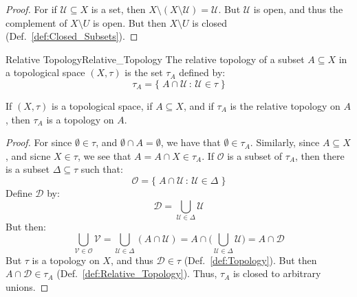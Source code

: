         \begin{proof}
            For if $\mathcal{U}\subseteq{X}$ is a set, then
            $X\setminus(X\setminus\mathcal{U})=\mathcal{U}$. But
            $\mathcal{U}$ is open, and thus the complement of
            $X\setminus{U}$ is open. But then $X\setminus{U}$
            is closed (Def.~\ref{def:Closed_Subsets}).
        \end{proof}
        \begin{ldefinition}{Relative Topology}{Relative_Topology}
            The relative topology of a subset
            $A\subseteq{X}$ in a topological space $(X,\tau)$ is
            the set $\tau_{A}$ defined by:
            \begin{equation}
                \tau_{A}=
                \big\{\;A\cap\mathcal{U}\,:\,
                    \mathcal{U}\in\tau\;\big\}
            \end{equation}
        \end{ldefinition}
        \begin{theorem}
            If $(X,\tau)$ is a topological space, if $A\subseteq{X}$,
            and if $\tau_{A}$ is the relative topology on $A$,
            then $\tau_{A}$ is a topology on $A$.
        \end{theorem}
        \begin{proof}
            For since $\emptyset\in\tau$, and
            $\emptyset\cap{A}=\emptyset$, we have that
            $\emptyset\in\tau_{A}$. Similarly, since
            $A\subseteq{X}$, and sicne $X\in\tau$, we see that
            $A=A\cap{X}\in\tau_{A}$. If $\mathcal{O}$ is a subset
            of $\tau_{A}$, then there is a subset
            $\Delta\subseteq\tau$ such that:
            \begin{equation}
                \mathcal{O}=\big\{\;A\cap\mathcal{U}\,:\,
                    \mathcal{U}\in\Delta\;\}
            \end{equation}
            Define $\mathcal{D}$ by:
            \begin{equation}
                \mathcal{D}=\bigcup_{\mathcal{U}\in\Delta}\mathcal{U}
            \end{equation}
            But then:
            \begin{equation}
                \bigcup_{\mathcal{V}\in\mathcal{O}}\mathcal{V}
                =\bigcup_{\mathcal{U}\in\Delta}(A\cap\mathcal{U})
                =A\cap\Big(\bigcup_{\mathcal{U}\in\Delta}\mathcal{U}
                    \Big)
                =A\cap\mathcal{D}
            \end{equation}
            But $\tau$ is a topology on $X$, and thus
            $\mathcal{D}\in\tau$ (Def.~\ref{def:Topology}). But
            then $A\cap\mathcal{D}\in\tau_{A}$
            (Def.~\ref{def:Relative_Topology}). Thus, $\tau_{A}$
            is closed to arbitrary unions.
        \end{proof}
